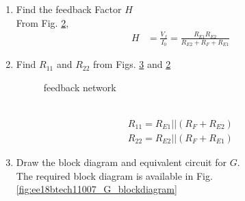 \begin{enumerate}[label=\thesection.\arabic*.,ref=\thesection.\theenumi]
\begin{figure}[!ht]
\begin{center}
		\resizebox{\columnwidth}{!}{}
	\end{center}
\caption{Feedback circuit block diagram}
\label{fig:ee18btech11007_H_blockdiagram}
\end{figure}
\begin{align}
    H=\frac{V_f}{I_o}|_{I_{1}=0} 
\end{align}
%
and the equivalent $H$ circuit is available in Fig. \ref{fig:ee18btech11007_circuit2}.

\begin{figure}[!ht]
	\begin{center}
		
		\resizebox{\columnwidth}{!}{}
	\end{center}
\caption{H circuit}
\label{fig:ee18btech11007_circuit2}
\end{figure}
\renewcommand{\thefigure}{\theenumi}
%
\item Find the feedback Factor $H$
\\
\solution From Fig. \ref{fig:ee18btech11007_circuit2}, 
\begin{align}
    H&=\frac{V_f}{I_0}=\frac{R_{E1}R_{E2}}{R_{E2}+R_F+R_{E1}} 
\end{align}
\item Find $R_{11}$ and $R_{22}$  from Figs. \ref{fig:ee18btech11007_feedback_network} and \ref{fig:ee18btech11007_circuit2}
\begin{figure}[!ht]
	\begin{center}
		
		\resizebox{\columnwidth}{!}{}
	\end{center}
\caption{feedback network}
\label{fig:ee18btech11007_feedback_network}
\end{figure}
\\
\solution
\begin{align}
    R_{11}=R_{E1}||(R_F+R_{E2})
\end{align}
\begin{align}
    R_{22}=R_{E2}||(R_F+R_{E1})
\end{align}
%
\item Draw the block diagram and equivalent circuit for $G$.
\\
\solution The required block diagram is available in Fig. \ref{fig:ee18btech11007_G_blockdiagram} 
\begin{figure}[!ht]
	\begin{center}
		

\end{center}
\end{figure}
\end{enumerate}
